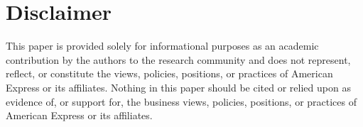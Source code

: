 \section*{Disclaimer}

This paper is provided solely for informational purposes as an academic contribution by the authors
to the research community and does not represent, reflect, or constitute the views, policies,
positions, or practices of American Express or its affiliates. Nothing in this paper should be cited
or relied upon as evidence of, or support for, the business views, policies, positions, or practices
of American Express or its affiliates.
